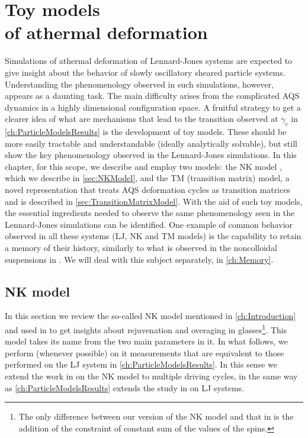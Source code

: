\chapter[Toy models of athermal deformation]{Toy models \\ of athermal deformation\label{ch:ToyModels}}

Simulations of athermal deformation of Lennard-Jones systems are expected to give insight about the behavior of slowly oscillatory sheared particle systems. Understanding the phenomenology observed in such simulations, however, appears as a daunting task. The main difficulty arises from the complicated AQS dynamics in a highly dimensional configuration space.
A fruitful strategy to get a clearer idea of what are mechanisms that lead to the transition observed at $\gamma_{c}$ in \autoref{ch:ParticleModelsResults} is the development of toy models. These should be more easily tractable and understandable (ideally analytically solvable), but still show the key phenomenology observed in the Lennard-Jones simulations. In this chapter, for this scope, we describe and employ two models: the NK model \cite{isner2006generic}, which we describe in \autoref{sec:NKModel}, and the TM (transition matrix) model, a novel representation that treats AQS deformation cycles as transition matrices and is described in \autoref{sec:TransitionMatrixModel}. 
With the aid of such toy models, the essential ingredients needed to observe the same phenomenology seen in the Lennard-Jones simulations can be identified. One example of common behavior observed in all these systems (LJ, NK and TM models) is the capability to retain a memory of their history, similarly to what is observed in the noncolloidal suspensions in \cite{keim2011generic}. We will deal with this subject separately, in \autoref{ch:Memory}.

\section{NK model \label{sec:NKModel}}

In this section we review the so-called NK model mentioned in \autoref{ch:Introduction} and used in \cite{isner2006generic} to get insights about rejuvenation and overaging in glasses\footnote{The only difference between our version of the NK model and that in \cite{isner2006generic} is the addition of the constraint of constant sum of the values of the spins.}. This model takes its name from the two main parameters in it. In what follows, we perform (whenever possible) on it measurements that are equivalent to those performed on the LJ system in \autoref{ch:ParticleModelsResults}. In this sense we extend the work in \cite{isner2006generic} on the NK model to multiple driving cycles, in the same way as \autoref{ch:ParticleModelsResults} extends the study in \cite{lacks2004energy} on LJ systems.

